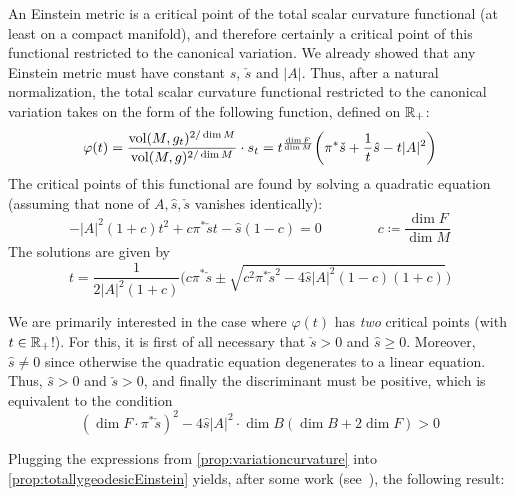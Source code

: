 An Einstein metric is a critical point of the total scalar curvature functional (at least on a compact manifold), and therefore certainly a critical point of this functional restricted to the canonical variation. We already showed that any Einstein metric must have constant $\hat s$, $\check s$ and $\lvert A\rvert$. Thus, after a natural normalization, the total scalar curvature functional restricted to the canonical variation takes on the form of the following function, defined on $\mathbb{R}_+$:
\begin{equation*}
	\varphi(t)=\frac{\operatorname{vol}(M,g_t)^{2/\dim M}}{\operatorname{vol}(M,g)^{2/\dim M}}\cdot s_t
	=t^{\frac{\dim F}{\dim M}}\bigg(\pi^*\check s+\frac{1}{t}\hat s-t\lvert A\rvert^2\bigg)
\end{equation*}
The critical points of this functional are found by solving a quadratic equation (assuming that none of $A,\hat  s,\check s$ vanishes identically):
\begin{equation*}
	-\lvert A\rvert^2(1+c) t^2+c\pi^*\check s t-\hat s(1-c) = 0\qquad \qquad c\coloneqq \frac{\dim F}{\dim M}
\end{equation*}
The solutions are given by
\begin{equation*}
	t=\frac{1}{2\lvert A\rvert^2(1+c)}\bigg(c\pi^*\check s \pm 
	\sqrt{c^2\pi^*\check s^2-4\hat s\lvert A\rvert^2(1-c)(1+c)}\bigg)
\end{equation*}

We are primarily interested in the case where $\varphi(t)$ has \emph{two} critical points (with $t\in \mathbb{R}_+$!). For this, it is first of all necessary that $\check s>0$ and $\hat s\geq 0$. Moreover, $\hat s\neq 0$ since otherwise the quadratic equation degenerates to a linear equation. Thus, $\hat s>0$ and $\check s>0$, and finally the discriminant must be positive, which is equivalent to the condition
\begin{equation}\label{eq:discriminant}
	(\dim F\cdot \pi^*\check s)^2-4\hat s\lvert A\rvert^2 \cdot \dim B(\dim B+2\dim F)>0
\end{equation}

Plugging the expressions from \cref{prop:variationcurvature} into \cref{prop:totallygeodesicEinstein} yields, after some work (see~\cite[152]{FIP2004}), the following result:

